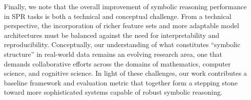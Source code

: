 \documentclass{article}
\begin{document}
Finally, we note that the overall improvement of symbolic reasoning performance in SPR tasks is both a technical and conceptual challenge. From a technical perspective, the incorporation of richer feature sets and more adaptable model architectures must be balanced against the need for interpretability and reproducibility. Conceptually, our understanding of what constitutes “symbolic structure” in real-world data remains an evolving research area, one that demands collaborative efforts across the domains of mathematics, computer science, and cognitive science. In light of these challenges, our work contributes a baseline framework and evaluation metric that together form a stepping stone toward more sophisticated systems capable of robust symbolic reasoning.



\end{document}

